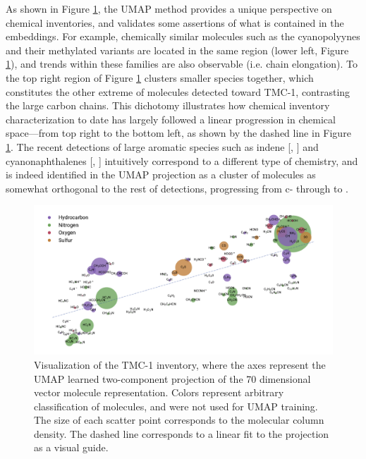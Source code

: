 \documentclass[twocolumn]{aastex63}
\begin{document}
As shown in Figure \ref{fig:umapviz}, the UMAP method provides a unique perspective on chemical inventories, and validates some assertions of what is contained in the embeddings. For example, chemically similar molecules such as the cyanopolyynes and their methylated variants are located in the same region (lower left, Figure \ref{fig:umapviz}), and trends within these families are also observable (i.e. chain elongation). To the top right region of Figure \ref{fig:umapviz} clusters smaller species together, which constitutes the other extreme of molecules detected toward TMC-1, contrasting the large carbon chains. This dichotomy illustrates how chemical inventory characterization to date has largely followed a linear progression in chemical space---from top right to the bottom left, as shown by the dashed line in Figure \ref{fig:umapviz}. The recent detections of large aromatic species such as indene [, \citep{burkhardt_discovery_2021}] and cyanonaphthalenes [, \citep{mcguire_detection_2021}] intuitively correspond to a different type of chemistry, and is indeed identified in the UMAP projection as a cluster of molecules as somewhat orthogonal to the rest of detections, progressing from c- through to .

\begin{figure}[ht]
    \centering
    \includegraphics[width=\textwidth]{umap_tmc1_viz_alllabel.pdf}
    \caption{Visualization of the TMC-1 inventory, where the axes represent the UMAP learned two-component projection of the 70 dimensional vector molecule representation. Colors represent arbitrary classification of molecules, and were not used for UMAP training. The size of each scatter point corresponds to the molecular column density. The dashed line corresponds to a linear fit to the projection as a visual guide.}
    \label{fig:umapviz}
\end{figure}
\end{document}

